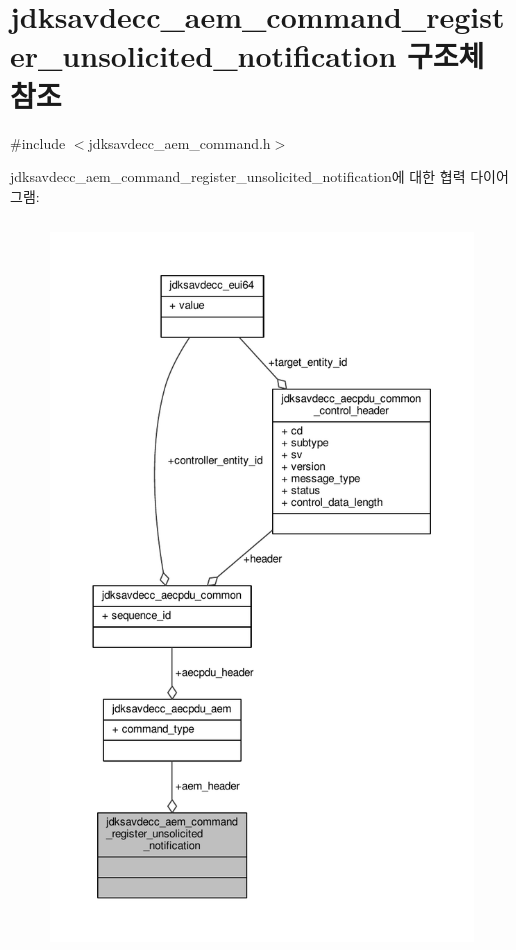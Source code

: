 \hypertarget{structjdksavdecc__aem__command__register__unsolicited__notification}{}\section{jdksavdecc\+\_\+aem\+\_\+command\+\_\+register\+\_\+unsolicited\+\_\+notification 구조체 참조}
\label{structjdksavdecc__aem__command__register__unsolicited__notification}


{\ttfamily \#include $<$jdksavdecc\+\_\+aem\+\_\+command.\+h$>$}



jdksavdecc\+\_\+aem\+\_\+command\+\_\+register\+\_\+unsolicited\+\_\+notification에 대한 협력 다이어그램\+:
\nopagebreak
\begin{figure}[H]
\begin{center}
\leavevmode
\includegraphics[height=550pt]{structjdksavdecc__aem__command__register__unsolicited__notification__coll__graph}
\end{center}
\end{figure}
